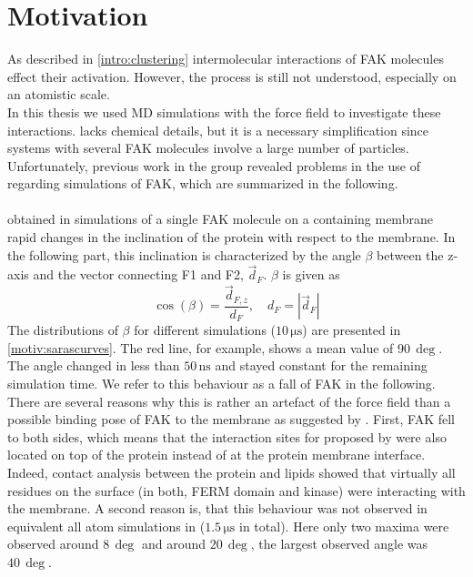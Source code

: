 \chapter{Motivation}
\label{motivation}
As described in \autoref{intro:clustering} intermolecular interactions of FAK molecules effect their activation. However, the process is still not understood, especially on an atomistic scale.\\
In this thesis we used MD simulations with the \martini{} force field to investigate these interactions. \martini{} lacks chemical details, but it is a necessary simplification since systems with several FAK molecules involve a large number of particles. Unfortunately, previous work in the group \autocite{sara} revealed problems in the use of \martini{} regarding simulations of FAK, which are summarized in the following.\\
\\
\textcite{sara} obtained in simulations of a single FAK molecule on a \pip{} containing membrane rapid changes in the inclination of the protein with respect to the membrane. In the following part, this inclination is characterized by the angle $\beta$ between the z-axis and the vector connecting F1 and F2, $\vec{d}_F$. $\beta$ is given as
\begin{equation}
\cos\left(\beta\right) = \frac{\vec{d}_{F, z}}{d_F},\quad d_F = \left|\vec{d}_F\right|
\end{equation}
The distributions of $\beta$ for different simulations ($10\,\si{\micro\second}$) are presented in \autoref{motiv:sarascurves}. The red line, for example, shows a mean value of $90\,\si{\deg}$. The angle changed in less than $50\,\si{\nano\second}$ and stayed constant for the remaining simulation time. We refer to this behaviour as a fall of FAK in the following.\\
There are several reasons why this is rather an artefact of the \martini{} force field than a possible binding pose of FAK to the membrane as suggested by \textcite{pap002}. First, FAK fell to both sides, which means that the interaction sites for \pip{} proposed by \textcite{pap002} were also located on top of the protein instead of at the protein membrane interface. Indeed, contact analysis between the protein and \pip{} lipids showed that virtually all residues on the surface (in both, FERM domain and kinase) were interacting with the membrane. A second reason is, that this behaviour was not observed in equivalent all atom simulations in \charmm{} ($1.5\,\si{\micro\second}$ in total). Here only two maxima were observed around $8\,\si{\deg}$ and around $20\,\si{\deg}$, the largest observed angle was $40\,\si{\deg}$.\\
